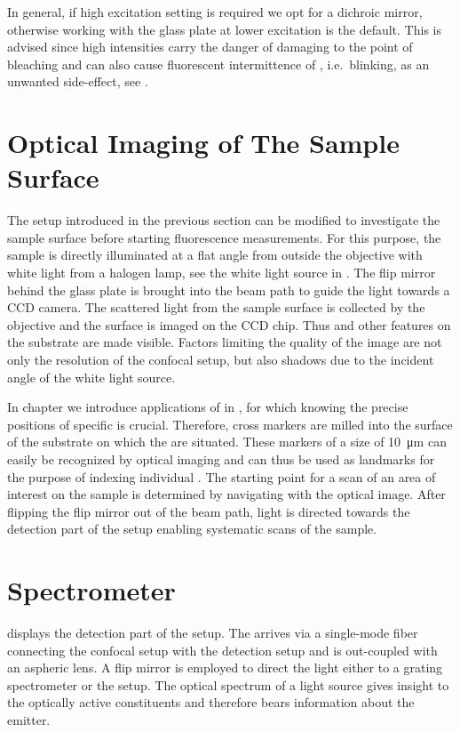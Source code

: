 		In general, if high excitation setting is required we opt for a dichroic mirror, otherwise working with the glass plate at lower excitation is the default. This is advised since high intensities carry the danger of damaging \sivs to the point of bleaching and can also cause fluorescent intermittence of \sivs, i.e.\ blinking, as an unwanted side-effect, see .

	\section[Surface Imaging]{Optical Imaging of The Sample Surface} \label{sec::methods_optical}

		The setup introduced in the previous section can be modified to investigate the sample surface before starting fluorescence measurements.
		For this purpose, the sample is directly illuminated at a flat angle from outside the objective with white light from a halogen lamp, see the white light source in .
		The flip mirror behind the glass plate is brought into the beam path to guide the light towards a CCD camera.
		The scattered light from the sample surface is collected by the objective and the surface is imaged on the CCD chip.
		Thus \nds and other features on the substrate are made visible.
		Factors limiting the quality of the image are not only the resolution of the confocal setup, but also shadows due to the incident angle of the white light source.

		In chapter  we introduce applications of \sivs in \nds, for which knowing the precise positions of specific \nds is crucial.
		Therefore, cross markers are milled into the surface of the substrate on which the \nds are situated.
		These markers of a size of \SI{10}{\micro\meter} can easily be recognized by optical imaging and can thus be used as landmarks for the purpose of indexing individual \sivs.
		The starting point for a scan of an area of interest on the sample is determined by navigating with the optical image.
		After flipping the flip mirror out of the beam path, light is directed towards the detection part of the setup enabling systematic scans of the sample.

	\section{Spectrometer} \label{sec::methods_spectrometer}

		 displays the detection part of the setup.
		The \fl arrives via a single-mode fiber connecting the confocal setup with the detection setup and is out-coupled with an aspheric lens.
		A flip mirror is employed to direct the light either to a grating spectrometer or the \hbt setup.
		The optical spectrum of a light source gives insight to the optically active constituents and therefore bears information about the emitter.

